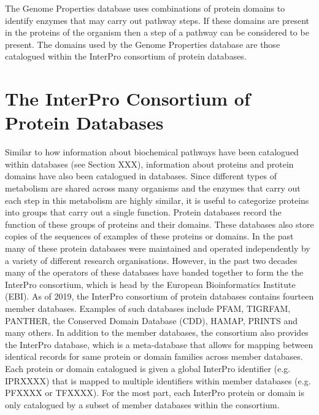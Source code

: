The Genome Properties database uses combinations of protein domains to identify enzymes that may carry out pathway steps. If these domains are present in the proteins of the organism then a step of a pathway can be considered to be present. The domains used by the Genome Properties database are those catalogued within the InterPro consortium of protein databases.

\section{The InterPro Consortium of Protein Databases}

Similar to how information about biochemical pathways have been catalogued within databases (see Section XXX), information about proteins and protein domains have also been catalogued in databases. Since different types of metabolism are shared across many organisms and the enzymes that carry out each step in this metabolism are highly similar, it is useful to categorize proteins into groups that carry out a single function. Protein databases record the function of these groups of proteins and their domains. These databases also store copies of the sequences of examples of these proteins or domains. In the past many of these protein databases were maintained and operated independently by a variety of different research organisations. However, in the past two decades many of the operators of these databases have banded together to form the the InterPro consortium, which is head by the European Bioinformatics Institute (EBI). As of 2019, the InterPro consortium of protein databases contains fourteen member databases. Examples of such databases include PFAM, TIGRFAM, PANTHER, the Conserved Domain Database (CDD), HAMAP, PRINTS  and many others. In addition to the member databases, the consortium also provides the InterPro database, which is a meta-database that allows for mapping between identical records for same protein or domain families across member databases. Each protein or domain catalogued is given a global InterPro identifier (e.g. IPRXXXX) that is mapped to multiple identifiers within member databases (e.g. PFXXXX or TFXXXX). For the most part, each InterPro protein or domain is only catalogued by a subset of member databases within the consortium.

